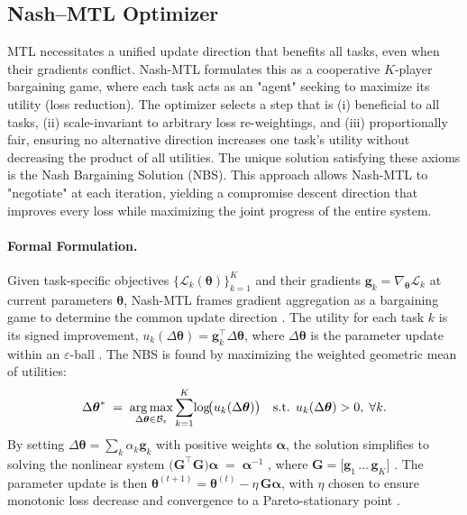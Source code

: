 \subsection{Nash–MTL Optimizer}\label{sec:nash_mtl}

MTL necessitates a unified update direction that benefits all tasks, even when their gradients conflict. Nash-MTL formulates this as a cooperative $K$-player bargaining game\cite{nash}, where each task acts as an "agent" seeking to maximize its utility (loss reduction). The optimizer selects a step that is (i) beneficial to all tasks, (ii) scale-invariant to arbitrary loss re-weightings, and (iii) proportionally fair, ensuring no alternative direction increases one task's utility without decreasing the product of all utilities\cite{nash}. The unique solution satisfying these axioms is the Nash Bargaining Solution (NBS). This approach allows Nash-MTL to "negotiate" at each iteration, yielding a compromise descent direction that improves every loss while maximizing the joint progress of the entire system.

\paragraph*{Formal Formulation.}
Given task-specific objectives $\{\mathcal{L}_k(\boldsymbol{\theta})\}_{k=1}^{K}$ and their gradients $\mathbf{g}_k=\nabla_{\!\boldsymbol{\theta}}\mathcal{L}_k$ at current parameters $\boldsymbol{\theta}$, Nash-MTL frames gradient aggregation as a bargaining game to determine the common update direction \cite{nash}. The utility for each task $k$ is its signed improvement, $u_k(\Delta\boldsymbol{\theta})=\mathbf{g}_k^{\!\top}\!\Delta\boldsymbol{\theta}$, where $\Delta\boldsymbol{\theta}$ is the parameter update within an $\varepsilon$-ball \cite{nash}. The NBS is found by maximizing the weighted geometric mean of utilities:
\begin{equation}
\Delta\boldsymbol{\theta}^{*}\;=\;\argmax_{\Delta\boldsymbol{\theta}\in\mathcal{B}_\varepsilon}
\sum_{k=1}^{K}\!\log\!\bigl(u_k(\Delta\boldsymbol{\theta})\bigr)
\quad\text{s.t. }u_k(\Delta\boldsymbol{\theta})>0,\;\forall k.
\label{eq:nbs_objective}
\end{equation}
By setting $\Delta\boldsymbol{\theta}=\sum_{k}\alpha_k\mathbf{g}_k$ with positive weights $\boldsymbol{\alpha}$, the solution simplifies to solving the nonlinear system $\bigl(\mathbf{G}^{\!\top}\mathbf{G}\bigr)\boldsymbol{\alpha} \;=\; \boldsymbol{\alpha}^{-1}$ \cite{nash}, where $\mathbf{G}=\bigl[\mathbf{g}_1\,\ldots\,\mathbf{g}_K\bigr]$ \cite{nash}. The parameter update is then $\boldsymbol{\theta}^{(t+1)} =\boldsymbol{\theta}^{(t)}-\eta\,\mathbf{G}\boldsymbol{\alpha}$, with $\eta$ chosen to ensure monotonic loss decrease and convergence to a Pareto-stationary point \cite{nash}.

